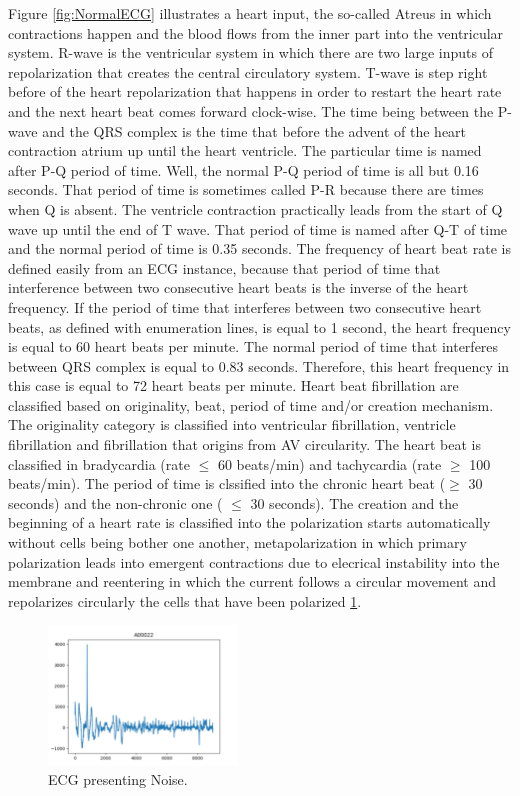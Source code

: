 \documentclass[review]{elsarticle}
\begin{document}
Figure \ref{fig:NormalECG} illustrates  a heart input, the so-called Atreus in which contractions happen and the blood flows from the inner part into the ventricular system. R-wave is the ventricular system in which there are two large inputs of repolarization that creates the central circulatory system. T-wave is step right before of the heart repolarization that happens in order to restart the heart rate and the next heart beat comes forward clock-wise. 
The time being between the P-wave and the QRS complex is the time that before the advent of the heart contraction atrium up until the heart ventricle. The particular time is named after P-Q period of time. Well, the normal P-Q period of time is all but 0.16 seconds. That period of time is sometimes called P-R because there are times when Q is absent. 
The ventricle contraction practically leads from the start of Q wave up until the end of T wave. That period of time is named after Q-T  of time and the normal period of time is 0.35 seconds. 
The frequency of heart beat rate is defined easily from an ECG instance, because that period of time that interference between two consecutive heart beats is the inverse of the heart frequency. If the period of time that interferes between two consecutive heart beats, as defined with enumeration lines, is equal to 1 second, the heart frequency is equal to 60 heart beats per minute. The normal period of time that interferes between QRS complex is equal to 0.83 seconds. Therefore, this heart frequency in this case is equal to 72 heart beats per minute. 
Heart beat fibrillation are classified based on originality, beat, period of time and/or creation mechanism. The originality category is classified into ventricular fibrillation, ventricle fibrillation and fibrillation that origins from AV circularity. The heart beat is classified in bradycardia (rate $\leq$ 60 beats/min) and tachycardia (rate $\geq$ 100 beats/min). The period of time is clssified into the chronic heart beat ($\ge$ 30 seconds) and the non-chronic one ( $\leq$ 30 seconds). The creation and the beginning of a heart rate is classified into the polarization starts automatically without cells being bother one another, metapolarization in which primary polarization leads into emergent contractions due to elecrical instability into the membrane and reentering in which the current follows a circular movement and repolarizes circularly the cells that have been polarized \ref{fig:boat1}. 

\begin{figure}
	\includegraphics[width=50mm,scale=0.5]{Figures/Noise.png}
	\centering
	\caption{ECG presenting Noise.}
	\label{fig:boat1}
\end{figure}
\end{document}
